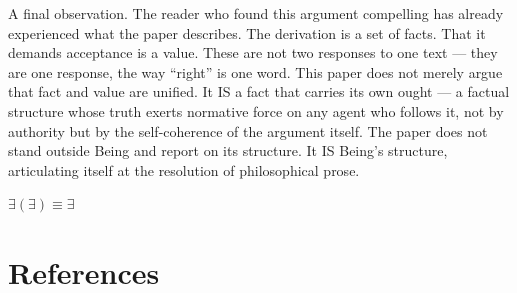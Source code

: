 \documentclass[12pt, letterpaper]{article}
\begin{document}
A final observation. The reader who found this argument compelling has already experienced what the paper describes. The derivation is a set of facts. That it demands acceptance is a value. These are not two responses to one text --- they are one response, the way ``right'' is one word. This paper does not merely argue that fact and value are unified. It IS a fact that carries its own ought --- a factual structure whose truth exerts normative force on any agent who follows it, not by authority but by the self-coherence of the argument itself. The paper does not stand outside Being and report on its structure. It IS Being's structure, articulating itself at the resolution of philosophical prose.

\vspace{2em}

\begin{center}
$\exists(\exists) \equiv \exists$
\end{center}

\newpage
\section*{References}
\end{document}
